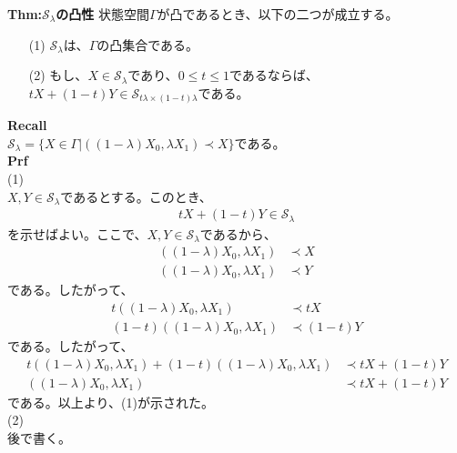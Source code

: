 \documentclass[a4paper,11pt]{jsarticle}
\begin{document}
\begin{itembox}[l]{\textbf{Thm:$\mathcal{S}_{\lambda}$の凸性}}
    状態空間$\Gamma$が凸であるとき、以下の二つが成立する。
    \begin{itemize}
        \item[(1)] $\mathcal{S}_{\lambda}$は、$\Gamma$の凸集合である。
        \item[(2)] もし、$X \in \mathcal{S}_{\lambda}$であり、$0 \leq t \leq 1$であるならば、$tX + (1-t)Y \in \mathcal{S}_{t\lambda \times (1-t)\lambda}$である。
    \end{itemize}
\end{itembox}
\textbf{Recall}\\
$\mathcal{S}_{\lambda}= \{X \in \Gamma|((1-\lambda)X_0,\lambda X_1) \prec X\}$である。\\
\textbf{Prf}\\
(1)\\
$X,Y \in \mathcal{S}_{\lambda}$であるとする。このとき、
\begin{align}
    tX+(1-t)Y \in \mathcal{S}_{\lambda}
\end{align}
を示せばよい。ここで、$X,Y \in \mathcal{S}_{\lambda}$であるから、
\begin{align}
    ((1-\lambda)X_0,\lambda X_1) &\prec X\\
    ((1-\lambda)X_0,\lambda X_1) &\prec Y
\end{align}
である。したがって、
\begin{align}
    t((1-\lambda)X_0,\lambda X_1) &\prec tX\\
    (1-t)((1-\lambda)X_0,\lambda X_1) &\prec (1-t)Y
\end{align}
である。したがって、
\begin{align}
    t((1-\lambda)X_0,\lambda X_1)+(1-t)((1-\lambda)X_0,\lambda X_1) &\prec tX+(1-t)Y\\
    ((1-\lambda)X_0,\lambda X_1) &\prec tX+(1-t)Y
\end{align}
である。以上より、(1)が示された。\\
(2)\\
後で書く。\\
\end{document}
